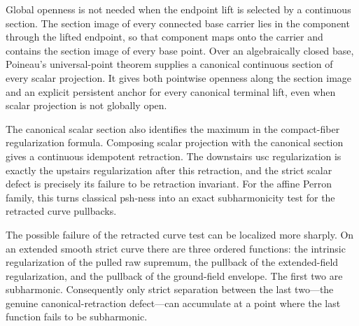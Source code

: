 Global openness is not needed when the endpoint lift is selected by a
continuous section.  The section image of every connected base carrier lies
in the component through the lifted endpoint, so that component maps onto the
carrier and contains the section image of every base point.  Over an
algebraically closed base, Poineau's universal-point theorem supplies a
canonical continuous section of every scalar projection.  It gives both
pointwise openness along the section image and an explicit persistent anchor
for every canonical terminal lift, even when scalar projection is not
globally open.

\medskip



The canonical scalar section also identifies the maximum in the compact-fiber
regularization formula.  Composing scalar projection with the canonical
section gives a continuous idempotent retraction.  The downstairs usc
regularization is exactly the upstairs regularization after this retraction,
and the strict scalar defect is precisely its failure to be retraction
invariant.  For the affine Perron family, this turns classical psh-ness into
an exact subharmonicity test for the retracted curve pullbacks.

\medskip



The possible failure of the retracted curve test can be localized more
sharply.  On an extended smooth strict curve there are three ordered
functions: the intrinsic regularization of the pulled raw supremum, the
pullback of the extended-field regularization, and the pullback of the
ground-field envelope.  The first two are subharmonic.  Consequently only
strict separation between the last two---the genuine canonical-retraction
defect---can accumulate at a point where the last function fails to be
subharmonic.

\medskip





